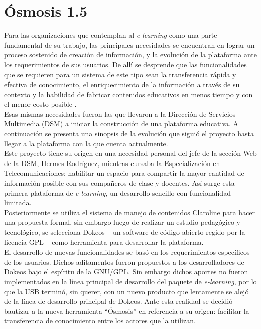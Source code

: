 \section{Ósmosis 1.5}
Para las organizaciones que contemplan al \emph{e-learning} como una parte fundamental de su trabajo, las principales necesidades se encuentran en lograr un proceso sostenido de creación de información, y la evolución de la plataforma ante los requerimientos de sus usuarios. De allí se desprende que las funcionalidades que se requieren para un sistema de este tipo sean la transferencia rápida y efectiva de conocimiento, el enriquecimiento de la información a través de su contexto y la habilidad de fabricar contenidos educativos en menos tiempo y con el menor costo posible \cite{Karrer2007}.\\

Esas mismas necesidades fueron las que llevaron a la Dirección de Servicios Multimedia (DSM) a iniciar la construcción de una plataforma educativa. A continuación se presenta una sinopsis de la evolución que siguió el proyecto hasta llegar a la plataforma con la que cuenta actualmente.\\

Este proyecto tiene su origen en una necesidad personal del jefe de la sección Web de la DSM, Hermes Rodríguez, mientras cursaba la Especialización en Telecomunicaciones: habilitar un espacio para compartir la mayor cantidad de información posible con sus compañeros de clase y docentes. Así surge esta primera plataforma de \emph{e-learning}, un desarrollo sencillo con funcionalidad limitada.\\ 

Posteriormente se utiliza el sistema de manejo de contenidos Claroline para hacer una propuesta formal, sin embargo luego de realizar un estudio pedagógico y tecnológico, se selecciona Dokeos -- un software de código abierto regido por la licencia GPL -- como herramienta para desarrollar la plataforma.\\

El desarrollo de nuevas funcionalidades se basó en los requerimientos específicos de los usuarios. Dichos aditamentos fueron propuestos a los desarrolladores de Dokeos bajo el espíritu de la GNU/GPL. Sin embargo dichos aportes no fueron implementados en la línea principal de desarrollo del paquete de \emph{e-learning}, por lo que la USB terminó, sin querer, con un nuevo producto que lentamente se alejó de la línea de desarrollo principal de Dokeos. Ante esta realidad se decidió bautizar a la nueva herramienta ``Ósmosis'' en referencia a su origen: facilitar la transferencia de conocimiento entre los actores que la utilizan. \\

